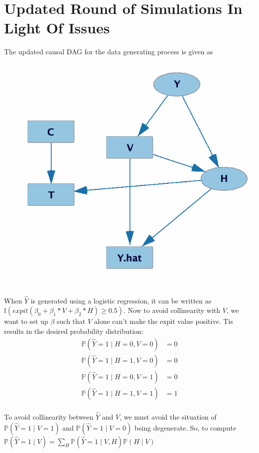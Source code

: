 \documentclass{article}
\begin{document}
\section{Updated Round of Simulations In Light Of Issues}
The updated causal DAG for the data generating process is given as 
\begin{center}
\includegraphics[scale = 0.5]{updated_DGP.png}
\end{center}

When $\hat{Y}$ is generated using a logistic regression, it can be written as $\mathbb{I}(expit(\beta_0 + \beta_1*V + \beta_2*H) \geq 0.5)$. Now to avoid collinearity with $V$, we want to set up $\beta$ such that $V$ alone can't make the expit value positive. Tis results in the desired probability distribution:
\begin{align*}
\mathbb{P}(\hat{Y} = 1\mid H = 0, V = 0) &= 0\\
\mathbb{P}(\hat{Y} = 1\mid H = 1, V = 0) &= 0\\
\mathbb{P}(\hat{Y} = 1\mid H = 0, V = 1) &= 0\\
\mathbb{P}(\hat{Y} = 1\mid H = 1, V = 1) &= 1\\
\end{align*}

To avoid collinearity between $\hat{Y}$ and $V$, we must avoid the situation of $\mathbb{P}(\hat{Y} = 1\mid V = 1)$ and $\mathbb{P}(\hat{Y} = 1\mid V = 0)$ being degenerate. So, to compute $\mathbb{P}(\hat{Y} = 1 \mid V) = \sum_{H}\mathbb{P}(\hat{Y} = 1 \mid V, H)\mathbb{P}(H \mid V)$
\end{document}
